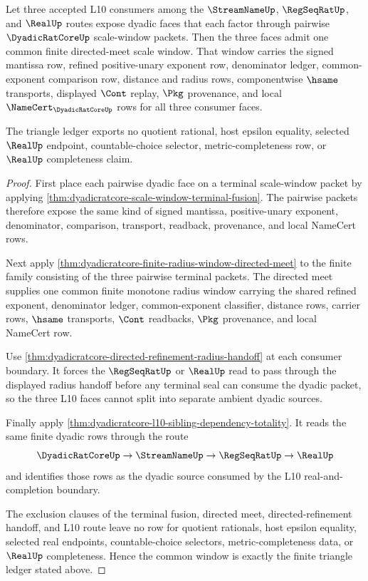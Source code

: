 \begin{theorem}
\label{thm:dyadicratcore-common-scale-window-triangle-ledger}
Let three accepted L10 consumers among the $\StreamNameUp$, $\RegSeqRatUp$, and $\RealUp$ routes expose dyadic faces that each factor through pairwise $\DyadicRatCoreUp$ scale-window packets. Then the three faces admit one common finite directed-meet scale window. That window carries the signed mantissa row, refined positive-unary exponent row, denominator ledger, common-exponent comparison row, distance and radius rows, componentwise $\hsame$ transports, displayed $\Cont$ replay, $\Pkg$ provenance, and local $\NameCert_{\DyadicRatCoreUp}$ rows for all three consumer faces.

The triangle ledger exports no quotient rational, host epsilon equality, selected $\RealUp$ endpoint, countable-choice selector, metric-completeness row, or $\RealUp$ completeness claim.
\end{theorem}
\begin{proof}
First place each pairwise dyadic face on a terminal scale-window packet by applying \autoref{thm:dyadicratcore-scale-window-terminal-fusion}. The pairwise packets therefore expose the same kind of signed mantissa, positive-unary exponent, denominator, comparison, transport, readback, provenance, and local NameCert rows.

Next apply \autoref{thm:dyadicratcore-finite-radius-window-directed-meet} to the finite family consisting of the three pairwise terminal packets. The directed meet supplies one common finite monotone radius window carrying the shared refined exponent, denominator ledger, common-exponent classifier, distance rows, carrier rows, $\hsame$ transports, $\Cont$ readbacks, $\Pkg$ provenance, and local NameCert row.

Use \autoref{thm:dyadicratcore-directed-refinement-radius-handoff} at each consumer boundary. It forces the $\RegSeqRatUp$ or $\RealUp$ read to pass through the displayed radius handoff before any terminal seal can consume the dyadic packet, so the three L10 faces cannot split into separate ambient dyadic sources.

Finally apply \autoref{thm:dyadicratcore-l10-sibling-dependency-totality}. It reads the same finite dyadic rows through the route
$$
\DyadicRatCoreUp \to \StreamNameUp \to \RegSeqRatUp \to \RealUp
$$
and identifies those rows as the dyadic source consumed by the L10 real-and-completion boundary.

The exclusion clauses of the terminal fusion, directed meet, directed-refinement handoff, and L10 route leave no row for quotient rationals, host epsilon equality, selected real endpoints, countable-choice selectors, metric-completeness data, or $\RealUp$ completeness. Hence the common window is exactly the finite triangle ledger stated above.
\end{proof}

